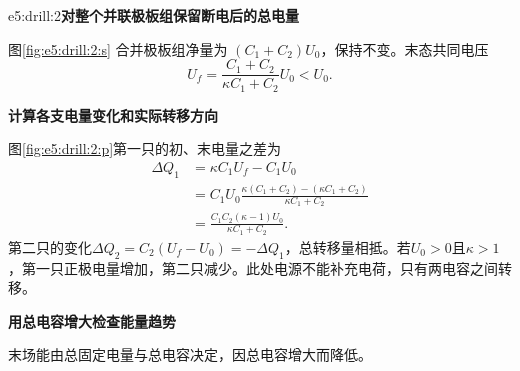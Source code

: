 \begin{drillsolution}{e5:drill:2}\textbf{对整个并联极板组保留断电后的总电量}\par\nobreak
图\ref{fig:e5:drill:2:s} 合并极板组净量为 $(C_1+C_2)U_0$，保持不变。末态共同电压
\[
 U_f=\frac{C_1+C_2}{\kappa C_1+C_2}U_0<U_0.
\]



\par\medskip{}\noindent\textbf{计算各支电量变化和实际转移方向}\par\nobreak
图\ref{fig:e5:drill:2:p}第一只的初、末电量之差为
\[
\begin{aligned}
\Delta Q_1&=\kappa C_1U_f-C_1U_0\\
&=C_1U_0\frac{\kappa(C_1+C_2)-(\kappa C_1+C_2)}{\kappa C_1+C_2}\\
&=\frac{C_1C_2(\kappa-1)U_0}{\kappa C_1+C_2}.
\end{aligned}
\]
第二只的变化$\Delta Q_2=C_2(U_f-U_0)=-\Delta Q_1$，总转移量相抵。若$U_0>0$且$\kappa>1$，第一只正极电量增加，第二只减少。此处电源不能补充电荷，只有两电容之间转移。

\par\medskip{}\noindent\textbf{用总电容增大检查能量趋势}\par\nobreak
末场能由总固定电量与总电容决定，因总电容增大而降低。\end{drillsolution}

